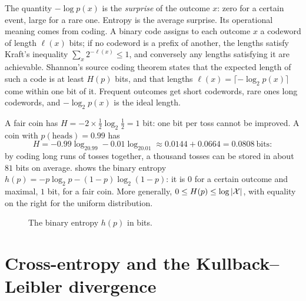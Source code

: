 \begin{notechapter}
The quantity $-\log p(x)$ is the \emph{surprise} of the outcome $x$: zero for a
certain event, large for a rare one. Entropy is the average surprise. Its
operational meaning comes from coding. A binary code assigns to each outcome $x$
a codeword of length $\ell(x)$ bits; if no codeword is a prefix of another, the
lengths satisfy Kraft's inequality $\sum_x2^{-\ell(x)}\leq1$, and conversely any
lengths satisfying it are achievable. Shannon's source coding theorem states
that the expected length of such a code is at least $H(p)$ bits, and that
lengths $\ell(x) = \lceil-\log_2p(x)\rceil$ come within one bit of it. Frequent
outcomes get short codewords, rare ones long codewords, and $-\log_2p(x)$ is the
ideal length.

\begin{example}[Coins]\label{cross-entropy:ex:coins}
A fair coin has $H = -2\times\frac12\log_2\frac12 = 1$ bit: one bit per toss cannot be
improved. A coin with $p(\text{heads}) = 0.99$ has
\[
  H = -0.99\log_20.99 - 0.01\log_20.01 \approx 0.0144 + 0.0664 = 0.0808\ \text{bits}:
\]
by coding long runs of tosses together, a thousand tosses can be stored in about
$81$ bits on average.  shows the binary entropy
$h(p) = -p\log_2p - (1-p)\log_2(1-p)$: it is $0$ for a certain outcome and maximal, $1$ bit,
for a fair coin. More generally, $0\leq H(p)\leq\log\left|\mathcal{X}\right|$, with equality on the
right for the uniform distribution.
\end{example}

\begin{figure}[ht]
\centering
{}
\caption{The binary entropy $h(p)$ in bits.}
\label{cross-entropy:fig:binary-entropy}
\end{figure}

\section{Cross-entropy and the Kullback--Leibler divergence}\label{cross-entropy:sec:ce-kl}


\end{notechapter}

